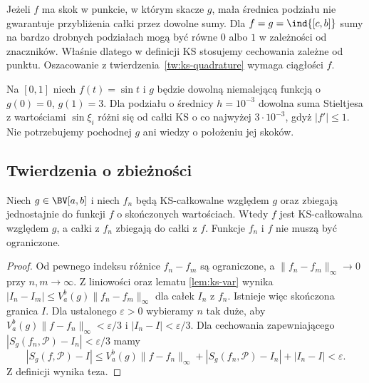 \begin{uwaga}
Jeżeli $f$ ma skok w punkcie, w którym skacze $g$, mała średnica podziału nie gwarantuje przybliżenia całki przez dowolne sumy. Dla $f=g=\ind{[c,b]}$ sumy na bardzo drobnych podziałach mogą być równe $0$ albo $1$ w zależności od znaczników. Właśnie dlatego w definicji KS stosujemy cechowania zależne od punktu. Oszacowanie z twierdzenia~\ref{tw:ks-quadrature} wymaga ciągłości $f$.
\end{uwaga}

\begin{przyklad}
Na $[0,1]$ niech $f(t)=\sin t$ i $g$ będzie dowolną niemalejącą funkcją o $g(0)=0$, $g(1)=3$. Dla podziału o średnicy $h=10^{-3}$ dowolna suma Stieltjesa z wartościami $\sin\xi_i$ różni się od całki KS o co najwyżej $3\cdot10^{-3}$, gdyż $|f'|\le1$. Nie potrzebujemy pochodnej $g$ ani wiedzy o położeniu jej skoków.
\end{przyklad}

\subsection*{Twierdzenia o zbieżności}
\begin{twierdzenie}\label{it:thm:ks-uniform}
Niech $g\in\BV[a,b]$ i niech $f_n$ będą KS-całkowalne
względem $g$ oraz zbiegają jednostajnie do funkcji $f$ o
skończonych wartościach. Wtedy $f$ jest KS-całkowalna
względem $g$, a całki z $f_n$ zbiegają do całki z $f$.
Funkcje $f_n$ i $f$ nie muszą być ograniczone.
\end{twierdzenie}
\begin{proof}
Od pewnego indeksu różnice $f_n-f_m$ są ograniczone, a
$\|f_n-f_m\|_\infty\to0$ przy $n,m\to\infty$.
Z liniowości oraz lematu \ref{lem:ks-var} wynika
$|I_n-I_m|\le V_a^b(g)\|f_n-f_m\|_\infty$ dla całek
$I_n$ z $f_n$. Istnieje więc skończona granica $I$.
Dla ustalonego $\varepsilon>0$ wybieramy $n$ tak duże,
aby $V_a^b(g)\|f-f_n\|_\infty<\varepsilon/3$ i
$|I_n-I|<\varepsilon/3$. Dla cechowania zapewniającego
$|S_g(f_n,\mathcal P)-I_n|<\varepsilon/3$ mamy
\[
 |S_g(f,\mathcal P)-I|
 \le V_a^b(g)\|f-f_n\|_\infty+
       |S_g(f_n,\mathcal P)-I_n|+|I_n-I|<\varepsilon.
\]
Z definicji wynika teza.
\end{proof}

